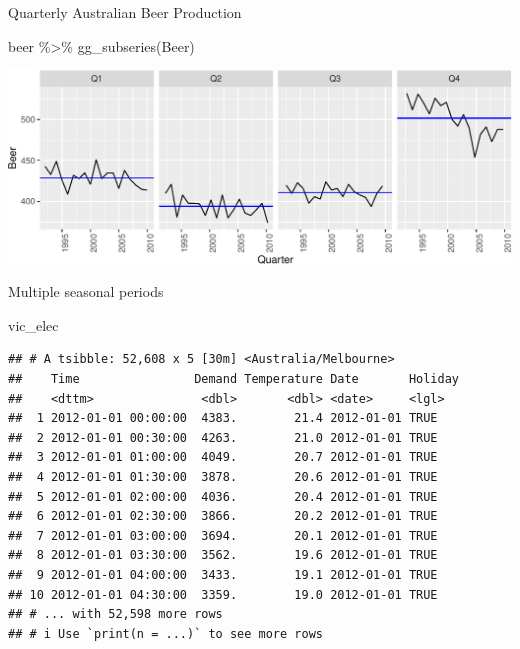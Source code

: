 \documentclass[14pt,ignorenonframetext,aspectratio=169]{beamer}
\newenvironment{Shaded}{\begin{snugshade}}{\end{snugshade}}
\newcommand{\FunctionTok}[1]{\textcolor[rgb]{0.00,0.00,0.00}{#1}}
\newcommand{\NormalTok}[1]{#1}
\newcommand{\SpecialCharTok}[1]{\textcolor[rgb]{0.00,0.00,0.00}{#1}}
\renewenvironment{Shaded}{\color{black}\begin{snugshade}\color{black}}{\end{snugshade}}
\renewenvironment{Shaded}{\color{black}\fontsize{10}{10}\sf\begin{snugshade}\color{black}}{\end{snugshade}}
\begin{document}
\begin{frame}[fragile]{Quarterly Australian Beer Production}
\protect\hypertarget{quarterly-australian-beer-production-2}{}
\fontsize{9}{9}\sf

\begin{Shaded}
\begin{Highlighting}[]
\NormalTok{beer }\SpecialCharTok{\%\textgreater{}\%} \FunctionTok{gg\_subseries}\NormalTok{(Beer)}
\end{Highlighting}
\end{Shaded}

\includegraphics{2-tsgraphics_files/figure-beamer/unnamed-chunk-16-1.pdf}
\end{frame}

\begin{frame}[fragile]{Multiple seasonal periods}
\protect\hypertarget{multiple-seasonal-periods}{}
\fontsize{9}{9}\sf

\begin{Shaded}
\begin{Highlighting}[]
\NormalTok{vic\_elec}
\end{Highlighting}
\end{Shaded}

\begin{verbatim}
## # A tsibble: 52,608 x 5 [30m] <Australia/Melbourne>
##    Time                Demand Temperature Date       Holiday
##    <dttm>               <dbl>       <dbl> <date>     <lgl>  
##  1 2012-01-01 00:00:00  4383.        21.4 2012-01-01 TRUE   
##  2 2012-01-01 00:30:00  4263.        21.0 2012-01-01 TRUE   
##  3 2012-01-01 01:00:00  4049.        20.7 2012-01-01 TRUE   
##  4 2012-01-01 01:30:00  3878.        20.6 2012-01-01 TRUE   
##  5 2012-01-01 02:00:00  4036.        20.4 2012-01-01 TRUE   
##  6 2012-01-01 02:30:00  3866.        20.2 2012-01-01 TRUE   
##  7 2012-01-01 03:00:00  3694.        20.1 2012-01-01 TRUE   
##  8 2012-01-01 03:30:00  3562.        19.6 2012-01-01 TRUE   
##  9 2012-01-01 04:00:00  3433.        19.1 2012-01-01 TRUE   
## 10 2012-01-01 04:30:00  3359.        19.0 2012-01-01 TRUE   
## # ... with 52,598 more rows
## # i Use `print(n = ...)` to see more rows
\end{verbatim}
\end{frame}
\end{document}
